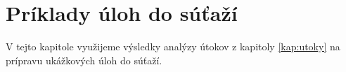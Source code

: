 \chapter{Príklady úloh do súťaží}

\label{kap:CTF} %

V tejto kapitole využijeme výsledky analýzy útokov z kapitoly \ref{kap:utoky} na prípravu ukážkových úloh do súťaží.